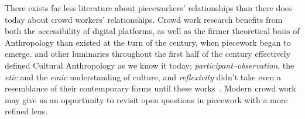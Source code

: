 \documentclass[trackingWork]{subfiles}
\begin{document}
There exists far less literature about pieceworkers' relationships than there does today about crowd workers' relationships.
Crowd work research benefits from both the accessibility of digital platforms, as well as the firmer theoretical basis of Anthropology than
existed at the turn of the  century, when piecework began to emerge.
\citeauthor{malinowski2002argonauts,boas1940race,mead1973coming} and
other luminaries throughout the first half of the  century
effectively defined Cultural Anthropology as we know it today;
\textit{participant--observation},
the \textit{etic} and the \textit{emic} understanding of culture, and
\textit{reflexivity}
didn't take even a resemblance of their contemporary forms until these works~\cite{malinowski2002argonauts,boas1940race,mead1973coming}.
Modern crowd work may give us an opportunity to revisit open questions in piecework with a more refined lens.





\end{document}

